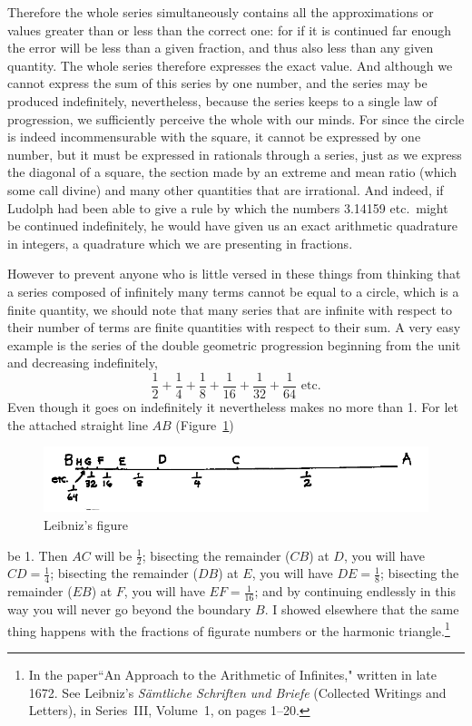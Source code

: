 \documentclass[polutonikogreek,english,twoside,openright]{article}
\begin{document}
\vspace*{1ex}

\noindent Therefore the whole series simultaneously contains all the
approximations or values greater than or less than the correct one:
for if it is continued far enough the error will be less than a given
fraction, and thus also less than any given quantity.  The whole
series therefore expresses the exact value.  And although we cannot
express the sum of this series by one number, and the series may be
produced indefinitely, nevertheless, because the series keeps to a
single law of progression, we sufficiently perceive the whole with our
minds. For since the circle is indeed incommensurable with the square,
it cannot be expressed by one number, but it must be expressed in
rationals through a series, just as we express the diagonal of a
square, the section made by an extreme and mean ratio (which some call
divine) and many other quantities that are irrational.  And indeed, if
Ludolph had been able to give a rule by which the numbers 3.14159
etc.\ might be continued indefinitely, he would have given us an exact
arithmetic quadrature in integers, a quadrature which we are
presenting in fractions.

However to prevent anyone who is little versed in these things from
thinking that a series composed of infinitely many terms cannot be
equal to a circle, which is a finite quantity, we should note that
many series that are infinite with respect to their number of terms
are finite quantities with respect to their sum.  A very easy example
is the series of the double geometric progression beginning from the
unit and decreasing indefinitely,
$$\frac{1}{2}
+ \frac{1}{4} +\frac{1}{8} + \frac{1}{16} + \frac{1}{32} +
\frac{1}{64}\mbox{ etc.}$$ Even though it goes on indefinitely it
nevertheless makes no more than 1.  For let the attached straight line
$AB$ (Figure~\ref{linesum})
\begin{figure}[htp]
  \begin{center}
    \includegraphics[width=\textwidth]{fig/Figure62}
    \vspace{-20pt}
    \caption{Leibniz's figure}
    \label{linesum}
  \end{center}
\end{figure} be 1.  Then $AC$ will be $\frac{1}{2}$; bisecting the
remainder ($CB$) at $D$, you will have $CD = \frac{1}{4}$; bisecting
the remainder ($DB$) at $E$, you will have $DE = \frac{1}{8}$;
bisecting the remainder ($EB$) at $F$, you will have
$EF = \frac{1}{16}$; and by continuing endlessly in this way you will
never go beyond the boundary $B$.  I showed elsewhere that the same
thing happens with the fractions of figurate numbers or the harmonic
triangle.\footnote{In the paper``An Approach to the Arithmetic of
  Infinites," written in late 1672.  See Leibniz's {\em S\"{a}mtliche
    Schriften und Briefe} (Collected Writings and Letters), in
  Series~III, Volume~1, on pages 1--20.}
\end{document}
